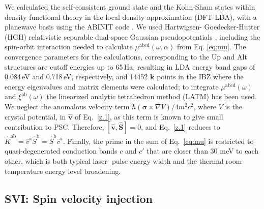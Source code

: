 \documentclass[floatfix,prb,aps,superscriptaddress,showpacs,11pt,preprint,letterpaper]{revtex4}
\begin{document}
We calculated the self-consistent ground state and the Kohn-Sham states within
density functional theory in the local density approximation (DFT-LDA), with a
planewave basis using the ABINIT code \cite{gonzeCPC09}. We used Hartwigsen-
Goedecker-Hutter (HGH) relativistic separable dual-space Gaussian
pseudopotentials \cite{hartwigsenPRB98}, including the spin-orbit interaction
needed to calculate $\mu^{\mathrm{abcd}}(\omega,\alpha)$ from Eq.
\eqref{eq:mu}.
The convergence parameters for the calculations,  corresponding to the Up and
Alt structures are cutoff energies up to 65\,Ha, resulting in LDA
energy band gaps of 0.084\,eV and 0.718\,eV, respectively, 
and 14452 ${\mathbf k}$ points in the IBZ
where the energy
eigenvalues and matrix elements were calculated;
to
integrate $\mu^{\mathrm{abcd}}(\omega)$ and
$\xi^{\mathrm{a}\mathrm{b}}(\omega)$ the linearized analytic tetrahedron method
(LATM) has been used.\cite{nastosPRB07} 
We neglect the anomalous velocity term
$\hbar(\boldsymbol{\sigma}\times\nabla V)/4m^2c^2$, where $V$ is the crystal
potential, in $\hat{\mathbf v}$ of Eq.~\eqref{z.1}, as this term is known to
give small contribution to PSC.\cite{bhatPRL05} Therefore, $[\hat{\mathbf
v},\hat{\mathbf S}]=0$, and Eq.~\eqref{z.1} reduces to $\hat
K^{\mathrm{a}\mathrm{b}}=\hat v^\mathrm{a} \hat S^\mathrm{b}=\hat S^\mathrm{b}
\hat v^\mathrm{a}$. Finally, the prime in the sum of Eq.~\eqref{eq:mu} is
restricted to quasi-degenerated conduction bands $c$ and $c'$ that are closer
than 30 meV to each other, which  is both typical laser- pulse energy width and the thermal
room-temperature energy level broadening.\cite{nastosPRB07}

\subsection{SVI: Spin velocity injection}
\label{sec:res-spin_velocity}
\end{document}
